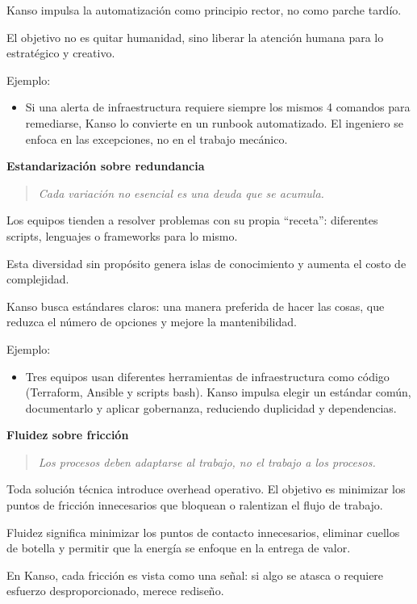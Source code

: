 Kanso impulsa la automatización como principio rector, no como parche tardío.

El objetivo no es quitar humanidad, sino liberar la atención humana para lo estratégico y creativo.

Ejemplo:
\begin{itemize}
    \item Si una alerta de infraestructura requiere siempre los mismos 4 comandos para remediarse, Kanso lo convierte en un runbook automatizado. El ingeniero se enfoca en las excepciones, no en el trabajo mecánico.
\end{itemize}

\textbf{Estandarización sobre redundancia}
\begin{quote}
\textit{Cada variación no esencial es una deuda que se acumula.}
\end{quote}

Los equipos tienden a resolver problemas con su propia ``receta'': diferentes scripts, lenguajes o frameworks para lo mismo.

Esta diversidad sin propósito genera islas de conocimiento y aumenta el costo de complejidad.

Kanso busca estándares claros: una manera preferida de hacer las cosas, que reduzca el número de opciones y mejore la mantenibilidad.

Ejemplo:
\begin{itemize}
    \item Tres equipos usan diferentes herramientas de infraestructura como código (Terraform, Ansible y scripts bash). Kanso impulsa elegir un estándar común, documentarlo y aplicar gobernanza, reduciendo duplicidad y dependencias.
\end{itemize}

\textbf{Fluidez sobre fricción}
\begin{quote}
\textit{Los procesos deben adaptarse al trabajo, no el trabajo a los procesos.}
\end{quote}

Toda solución técnica introduce overhead operativo. El objetivo es minimizar los puntos de fricción innecesarios que bloquean o ralentizan el flujo de trabajo.

Fluidez significa minimizar los puntos de contacto innecesarios, eliminar cuellos de botella y permitir que la energía se enfoque en la entrega de valor.

En Kanso, cada fricción es vista como una señal: si algo se atasca o requiere esfuerzo desproporcionado, merece rediseño.

